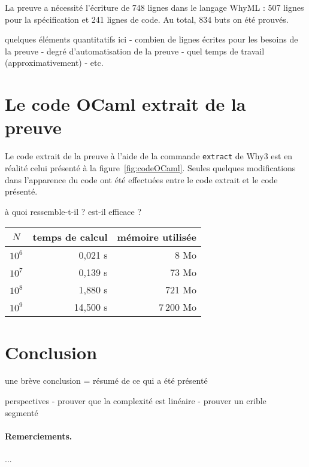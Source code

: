 \documentclass[a4paper]{easychair}
\begin{document}
La preuve a nécessité l'écriture de 748 lignes dans le langage WhyML :
507 lignes pour la spécification et 241 lignes de code.
Au total, 834 buts on été prouvés.


quelques éléments quantitatifs ici
- combien de lignes écrites pour les besoins de la preuve
- degré d'automatisation de la preuve
- quel temps de travail (approximativement)
- etc.

\section{Le code OCaml extrait de la preuve}

Le code extrait de la preuve à l'aide de la commande \texttt{extract} de Why3
est en réalité celui présenté à la figure~\ref{fig:codeOCaml}.
Seules quelques modifications dans l'apparence du code ont été effectuées
entre le code extrait et le code présenté.

à quoi ressemble-t-il ?
est-il efficace ?

\begin{center}
  \begin{tabular}{|c|r|r|}
    \hline
    $N$ & temps de calcul & mémoire utilisée \\
    \hline\hline
    $10^6$ &  0,021 s &      8 Mo \\\hline
    $10^7$ &  0,139 s &     73 Mo \\\hline
    $10^8$ &  1,880 s &    721 Mo \\\hline
    $10^9$ & 14,500 s & 7\,200 Mo \\\hline
  \end{tabular}
\end{center}

\section{Conclusion}
\label{sec:conclusion}

une brève conclusion = résumé de ce qui a été présenté

perspectives
- prouver que la complexité est linéaire
- prouver un crible segmenté~\cite{crible-segmente}


\paragraph{Remerciements.} ...



\end{document}
